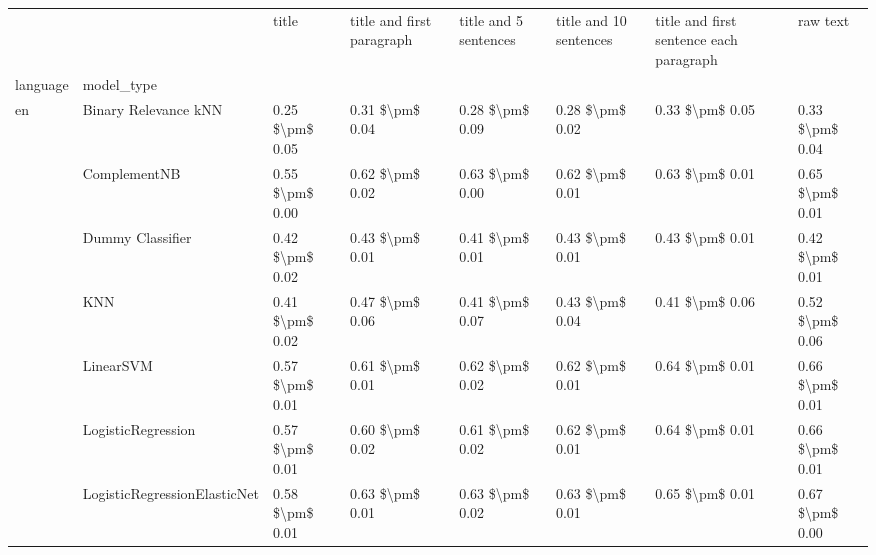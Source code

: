 \begin{tabular}{llllllll}
\toprule
   &         &            title & title and first paragraph & title and 5 sentences & title and 10 sentences & title and first sentence each paragraph &             raw text \\
language & model\_type &                  &                           &                       &                        &                                         &                      \\
\midrule
en & Binary Relevance kNN &  0.25 \$\textbackslash pm\$ 0.05 &           0.31 \$\textbackslash pm\$ 0.04 &       0.28 \$\textbackslash pm\$ 0.09 &        0.28 \$\textbackslash pm\$ 0.02 &                         0.33 \$\textbackslash pm\$ 0.05 &      0.33 \$\textbackslash pm\$ 0.04 \\
   & ComplementNB &  0.55 \$\textbackslash pm\$ 0.00 &           0.62 \$\textbackslash pm\$ 0.02 &       0.63 \$\textbackslash pm\$ 0.00 &        0.62 \$\textbackslash pm\$ 0.01 &                         0.63 \$\textbackslash pm\$ 0.01 &      0.65 \$\textbackslash pm\$ 0.01 \\
   & Dummy Classifier &  0.42 \$\textbackslash pm\$ 0.02 &           0.43 \$\textbackslash pm\$ 0.01 &       0.41 \$\textbackslash pm\$ 0.01 &        0.43 \$\textbackslash pm\$ 0.01 &                         0.43 \$\textbackslash pm\$ 0.01 &      0.42 \$\textbackslash pm\$ 0.01 \\
   & KNN &  0.41 \$\textbackslash pm\$ 0.02 &           0.47 \$\textbackslash pm\$ 0.06 &       0.41 \$\textbackslash pm\$ 0.07 &        0.43 \$\textbackslash pm\$ 0.04 &                         0.41 \$\textbackslash pm\$ 0.06 &      0.52 \$\textbackslash pm\$ 0.06 \\
   & LinearSVM &  0.57 \$\textbackslash pm\$ 0.01 &           0.61 \$\textbackslash pm\$ 0.01 &       0.62 \$\textbackslash pm\$ 0.02 &        0.62 \$\textbackslash pm\$ 0.01 &                         0.64 \$\textbackslash pm\$ 0.01 &      0.66 \$\textbackslash pm\$ 0.01 \\
   & LogisticRegression &  0.57 \$\textbackslash pm\$ 0.01 &           0.60 \$\textbackslash pm\$ 0.02 &       0.61 \$\textbackslash pm\$ 0.02 &        0.62 \$\textbackslash pm\$ 0.01 &                         0.64 \$\textbackslash pm\$ 0.01 &      0.66 \$\textbackslash pm\$ 0.01 \\
   & LogisticRegressionElasticNet &  0.58 \$\textbackslash pm\$ 0.01 &           0.63 \$\textbackslash pm\$ 0.01 &       0.63 \$\textbackslash pm\$ 0.02 &        0.63 \$\textbackslash pm\$ 0.01 &                         0.65 \$\textbackslash pm\$ 0.01 &      0.67 \$\textbackslash pm\$ 0.00 \\

\end{tabular}
